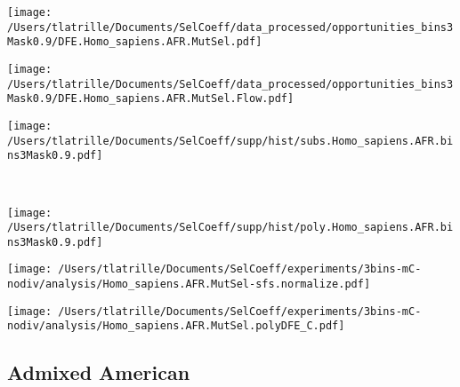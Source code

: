 \documentclass{article}
\begin{document}
    \begin{minipage}{0.32\linewidth}
        \texttt{[image: /Users/tlatrille/Documents/SelCoeff/data\_processed/opportunities\_bins3Mask0.9/DFE.Homo\_sapiens.AFR.MutSel.pdf]}
    \end{minipage}
    \begin{minipage}{0.32\linewidth}
        \texttt{[image: /Users/tlatrille/Documents/SelCoeff/data\_processed/opportunities\_bins3Mask0.9/DFE.Homo\_sapiens.AFR.MutSel.Flow.pdf]}
    \end{minipage}
    \begin{minipage}{0.32\linewidth}
        \texttt{[image: /Users/tlatrille/Documents/SelCoeff/supp/hist/subs.Homo\_sapiens.AFR.bins3Mask0.9.pdf]}
    \end{minipage}
    \\
    \begin{minipage}{0.32\linewidth}
        \texttt{[image: /Users/tlatrille/Documents/SelCoeff/supp/hist/poly.Homo\_sapiens.AFR.bins3Mask0.9.pdf]}
    \end{minipage}
    \begin{minipage}{0.32\linewidth}
        \texttt{[image: /Users/tlatrille/Documents/SelCoeff/experiments/3bins-mC-nodiv/analysis/Homo\_sapiens.AFR.MutSel-sfs.normalize.pdf]}
    \end{minipage}
    \begin{minipage}{0.32\linewidth}
        \texttt{[image: /Users/tlatrille/Documents/SelCoeff/experiments/3bins-mC-nodiv/analysis/Homo\_sapiens.AFR.MutSel.polyDFE\_C.pdf]}
    \end{minipage}
    \subsection{Admixed American}
\end{document}
